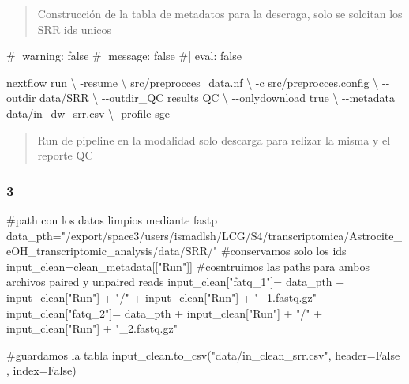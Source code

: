 \documentclass[
  10pt,
]{article}
\newenvironment{Shaded}{\begin{snugshade}}{\end{snugshade}}
\newcommand{\CommentTok}[1]{\textcolor[rgb]{0.37,0.37,0.37}{#1}}
\newcommand{\NormalTok}[1]{\textcolor[rgb]{0.00,0.23,0.31}{#1}}
\newcommand{\OperatorTok}[1]{\textcolor[rgb]{0.37,0.37,0.37}{#1}}
\newcommand{\StringTok}[1]{\textcolor[rgb]{0.13,0.47,0.30}{#1}}
\newcommand{\VariableTok}[1]{\textcolor[rgb]{0.07,0.07,0.07}{#1}}
\begin{document}
\begin{quote}
Construcción de la tabla de metadatos para la descraga, solo se solcitan
los SRR ids unicos
\end{quote}

\begin{Shaded}
\begin{Highlighting}[]
\NormalTok{\#| warning: false}
\NormalTok{\#| message: false}
\NormalTok{\#| eval: false}

\NormalTok{nextflow run \textbackslash{}}
\NormalTok{    {-}resume \textbackslash{}}
\NormalTok{    src/preprocces\_data.nf \textbackslash{}}
\NormalTok{    {-}c src/preprocces.config \textbackslash{}}
\NormalTok{    {-}{-}outdir data/SRR \textbackslash{}}
\NormalTok{    {-}{-}outdir\_QC results QC \textbackslash{}}
\NormalTok{    {-}{-}onlydownload true \textbackslash{}}
\NormalTok{    {-}{-}metadata data/in\_dw\_srr.csv \textbackslash{}}
\NormalTok{    {-}profile sge}
\end{Highlighting}
\end{Shaded}

\begin{quote}
Run de pipeline en la modalidad solo descarga para relizar la misma y el
reporte QC
\end{quote}

\subsubsection{3}\label{section-2}

\begin{Shaded}
\begin{Highlighting}[]
\CommentTok{\#path con los datos limpios mediante fastp}
\NormalTok{data\_pth}\OperatorTok{=}\StringTok{"/export/space3/users/ismadlsh/LCG/S4/transcriptomica/Astrocite\_eOH\_transcriptomic\_analysis/data/SRR/"}
\CommentTok{\#conservamos solo los ids}
\NormalTok{input\_clean}\OperatorTok{=}\NormalTok{clean\_metadata[[}\StringTok{"Run"}\NormalTok{]]}
\CommentTok{\#cosntruimos las paths para ambos archivos paired y unpaired reads}
\NormalTok{input\_clean[}\StringTok{"fatq\_1"}\NormalTok{]}\OperatorTok{=}\NormalTok{ data\_pth }\OperatorTok{+}\NormalTok{ input\_clean[}\StringTok{"Run"}\NormalTok{] }\OperatorTok{+} \StringTok{"/"} \OperatorTok{+}\NormalTok{ input\_clean[}\StringTok{"Run"}\NormalTok{] }\OperatorTok{+} \StringTok{"\_1.fastq.gz"} 
\NormalTok{input\_clean[}\StringTok{"fatq\_2"}\NormalTok{]}\OperatorTok{=}\NormalTok{ data\_pth }\OperatorTok{+}\NormalTok{ input\_clean[}\StringTok{"Run"}\NormalTok{] }\OperatorTok{+} \StringTok{"/"} \OperatorTok{+}\NormalTok{ input\_clean[}\StringTok{"Run"}\NormalTok{] }\OperatorTok{+} \StringTok{"\_2.fastq.gz"} 

\CommentTok{\#guardamos la tabla }
\NormalTok{input\_clean.to\_csv(}\StringTok{"data/in\_clean\_srr.csv"}\NormalTok{, header}\OperatorTok{=}\VariableTok{False}\NormalTok{ , index}\OperatorTok{=}\VariableTok{False}\NormalTok{)}
\end{Highlighting}
\end{Shaded}
\end{document}
